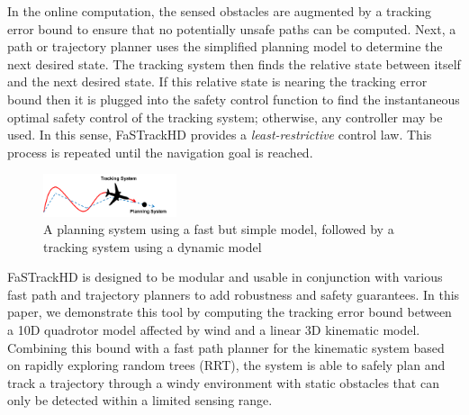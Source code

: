 In the online computation, the sensed obstacles are augmented by a tracking error bound to ensure that no potentially unsafe paths can be computed. Next, a path or trajectory planner uses the simplified planning model to determine the next desired state. The tracking system then finds the relative state between itself and the next desired state. If this relative state is nearing the tracking error bound then it is plugged into the safety control function to find the instantaneous optimal safety control of the tracking system; otherwise, any controller may be used. In this sense, FaSTrackHD provides a \emph{least-restrictive} control law. This process is repeated until the navigation goal is reached. 
  

\begin{figure}
	\centering
	\includegraphics[width=0.35\textwidth]{fig/chasing}
	\caption{A planning system using a fast but simple model, followed by a tracking system using a dynamic model}
	\label{fig:chasing}
	\vspace{-.2in}
\end{figure}
%
FaSTrackHD is designed to be modular and usable in conjunction with various fast path and trajectory planners to add robustness and safety guarantees. In this paper, we demonstrate this tool by computing the tracking error bound between a 10D quadrotor model affected by wind and a linear 3D kinematic model. Combining this bound with a fast path planner for the kinematic system based on rapidly exploring random trees (RRT), the system is able to safely plan and track a trajectory through a windy environment with static obstacles that can only be detected within a limited sensing range.